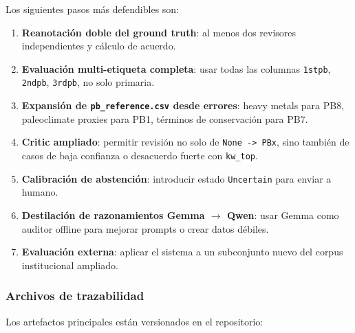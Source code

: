 Los siguientes pasos más defendibles son:

\begin{enumerate}
\item \textbf{Reanotación doble del ground truth}: al menos dos revisores independientes y cálculo de acuerdo.
\item \textbf{Evaluación multi-etiqueta completa}: usar todas las columnas \texttt{1stpb}, \texttt{2ndpb}, \texttt{3rdpb}, no solo primaria.
\item \textbf{Expansión de \texttt{pb\_reference.csv} desde errores}: heavy metals para PB8, paleoclimate proxies para PB1, términos de conservación para PB7.
\item \textbf{Critic ampliado}: permitir revisión no solo de \texttt{None -> PBx}, sino también de casos de baja confianza o desacuerdo fuerte con \texttt{kw\_top}.
\item \textbf{Calibración de abstención}: introducir estado \texttt{Uncertain} para enviar a humano.
\item \textbf{Destilación de razonamientos Gemma $\rightarrow$ Qwen}: usar Gemma como auditor offline para mejorar prompts o crear datos débiles.
\item \textbf{Evaluación externa}: aplicar el sistema a un subconjunto nuevo del corpus institucional ampliado.
\end{enumerate}

\subsubsection*{Archivos de trazabilidad}

Los artefactos principales están versionados en el repositorio:
 

